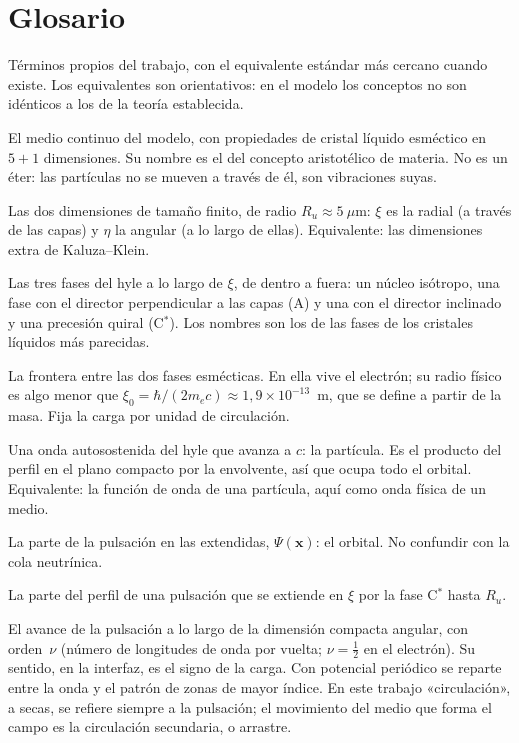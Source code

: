 \documentclass[11pt,a4paper]{article}
\newcommand{\Cst}{C\ensuremath{^{*}}}
\newcommand{\vb}[1]{\symbf{#1}}
\begin{document}
\section*{Glosario}

Términos propios del trabajo, con el equivalente estándar más cercano cuando existe. Los equivalentes son orientativos: en el modelo los conceptos no son idénticos a los de la teoría establecida.

\begin{description}[leftmargin=1.5em,style=nextline,itemsep=0.2em]
\item[Hyle] El medio continuo del modelo, con propiedades de cristal líquido esméctico en $5+1$ dimensiones. Su nombre es el del concepto aristotélico de materia. No es un éter: las partículas no se mueven a través de él, son vibraciones suyas.
\item[Dimensiones compactas $(\xi,\eta)$] Las dos dimensiones de tamaño finito, de radio $R_u\approx5~\mu$m: $\xi$ es la radial (a través de las capas) y $\eta$ la angular (a lo largo de ellas). Equivalente: las dimensiones extra de Kaluza--Klein.
\item[Esméctico A, esméctico \Cst, núcleo fluido] Las tres fases del hyle a lo largo de $\xi$, de dentro a fuera: un núcleo isótropo, una fase con el director perpendicular a las capas (A) y una con el director inclinado y una precesión quiral (\Cst). Los nombres son los de las fases de los cristales líquidos más parecidas.
\item[Interfaz A/\Cst] La frontera entre las dos fases esmécticas. En ella vive el electrón; su radio físico es algo menor que $\xi_0=\hbar/(2m_ec)\approx1,9\times10^{-13}$~m, que se define a partir de la masa. Fija la carga por unidad de circulación.
\item[Pulsación] Una onda autosostenida del hyle que avanza a $c$: la partícula. Es el producto del perfil en el plano compacto por la envolvente, así que ocupa todo el orbital. Equivalente: la función de onda de una partícula, aquí como onda física de un medio.
\item[Envolvente] La parte de la pulsación en las extendidas, $\Psi(\vb{x})$: el orbital. No confundir con la cola neutrínica.
\item[Cola neutrínica] La parte del perfil de una pulsación que se extiende en $\xi$ por la fase \Cst{} hasta $R_u$.
\item[Circulación en $\eta$] El avance de la pulsación a lo largo de la dimensión compacta angular, con orden~$\nu$ (número de longitudes de onda por vuelta; $\nu=\tfrac12$ en el electrón). Su sentido, en la interfaz, es el signo de la carga. Con potencial periódico se reparte entre la onda y el patrón de zonas de mayor índice. En este trabajo «circulación», a secas, se refiere siempre a la pulsación; el movimiento del medio que forma el campo es la circulación secundaria, o arrastre.

\end{description}
\end{document}
